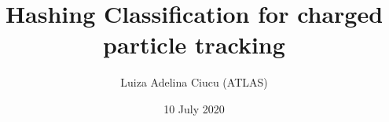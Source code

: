 \documentclass{beamer}
\title[Hashing classification for tracking ]{Hashing Classification for charged particle tracking}
\author[Luiza Adelina Ciucu (ATLAS) ]{Luiza Adelina Ciucu (ATLAS)}
\date{10 July 2020}
\begin{document}
\frame{\titlepage}


\newcommand\inputFolderMerge{../output_new_ev_000_100_min_10}
\newcommand\inputFolderMergedBalanced{../output_new_ev_000_100_min_10_balanced17}
\newcommand\inputFolderNN{../output_new_ev_000_100_min_10_NN_07}
\newcommand\inputFolderOverlay{../output_overlay_balanced_ev_000_100_Min10_17_B}


\def\volumeID{\texttt{\detokenize{volume_id}}}
\def\layerID{\texttt{\detokenize{layer_id}}}

\def\TP{\ifmmode {\mathrm{TP}}\else
                   \textrm{TP}\fi}%
\def\FP{\ifmmode {\mathrm{FP}}\else
                   \textrm{FP}\fi}%
\def\FN{\ifmmode {\mathrm{FN}}\else
                   \textrm{FN}\fi}%
\def\TN{\ifmmode {\mathrm{TN}}\else
                   \textrm{TN}\fi}%

\def\Ni{\ifmmode {\mathrm{N}_\mathrm{i}}\else
                   \textrm{N}_{\textrm{i}}\fi}%
\def\wi{\ifmmode {\mathrm{w}_\mathrm{i}}\else
                   \textrm{w}_{\textrm{i}}\fi}%
\def\xi{\ifmmode {\mathrm{x}_\mathrm{i}}\else
                   \textrm{x}_{\textrm{i}}\fi}%
\def\wzero{\ifmmode {\mathrm{w}_\mathrm{0}}\else
                   \textrm{w}_{\textrm{0}}\fi}%
\def\xzero{\ifmmode {\mathrm{x}_\mathrm{0}}\else
                   \textrm{x}_{\textrm{0}}\fi}%
                   
\end{document}

